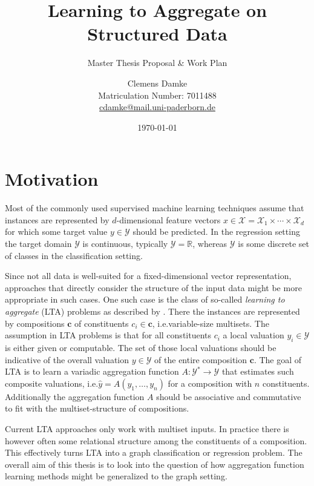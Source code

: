 \documentclass[12pt]{scrartcl}
\makeatletter
\newcommand{\thesisTitle}{Learning to Aggregate on Structured Data}
\newcommand{\thesisSubject}{Master Thesis Proposal \& Work Plan}
\newcommand{\thesisName}{Clemens Damke}
\newcommand{\thesisMail}{cdamke@mail.uni-paderborn.de}
\newcommand{\thesisMatNr}{7011488}
\makeatother
\begin{document}
\title{\thesisTitle}
\subtitle{\thesisSubject}
\author{{\thesisName}\\\small{Matriculation Number: \thesisMatNr}\\\small{\href{mailto:\thesisMail}{\thesisMail}}}
\date{\today}
\maketitle

\section{Motivation}%
\label{sec:motivation}

Most of the commonly used supervised machine learning techniques assume that instances are represented by $d$-dimensional feature vectors $x \in \mathcal{X} = \mathcal{X}_1 \times \cdots \times \mathcal{X}_d$ for which some target value $y \in \mathcal{Y}$ should be predicted.
In the regression setting the target domain $\mathcal{Y}$ is continuous, typically $\mathcal{Y} = \mathbb{R}$, whereas $\mathcal{Y}$ is some discrete set of classes in the classification setting.

Since not all data is well-suited for a fixed-dimensional vector representation, approaches that directly consider the structure of the input data might be more appropriate in such cases.
One such case is the class of so-called \textit{learning to aggregate} (LTA) problems as described by \citet{Melnikov2016}.
There the instances are represented by compositions $\bm{c}$ of constituents $c_i \in \bm{c}$, i.e.\@ variable-size multisets.
The assumption in LTA problems is that for all constituents $c_i$ a local valuation $y_i \in \mathcal{Y}$ is either given or computable.
The set of those local valuations should be indicative of the overall valuation $y \in \mathcal{Y}$ of the entire composition $\bm{c}$.
The goal of LTA is to learn a variadic aggregation function $A: \mathcal{Y}^{*} \to \mathcal{Y}$ that estimates such composite valuations, i.e.\@ $\hat{y} = A(y_1, \dots, y_n)$ for a composition with $n$ constituents.
Additionally the aggregation function $A$ should be associative and commutative to fit with the multiset-structure of compositions.

Current LTA approaches only work with multiset inputs.
In practice there is however often some relational structure among the constituents of a composition.
This effectively turns LTA into a graph classification or regression problem.
The overall aim of this thesis is to look into the question of how aggregation function learning methods might be generalized to the graph setting.
\end{document}
